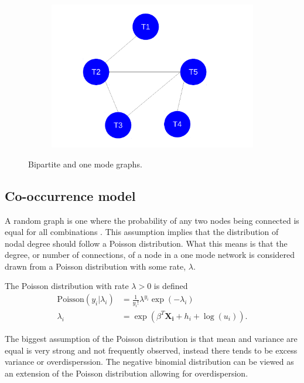 \documentclass[12pt,letterpaper]{article}
\begin{document}
\begin{figure}[ht]
  \begin{subfigure}[b]{0.4\textwidth}
    \caption{}
    \includegraphics[height = 0.5\textheight, width = \textwidth, keepaspectratio = true]{figure/one_mode}
    \label{subfig:one_mode}
  \end{subfigure}
  \caption{Bipartite and one mode graphs.}
  \label{fig:graphs}
\end{figure}


\subsection{Co-occurrence model}
A random graph is one where the probability of any two nodes being connected is equal for all combinations \citep{Erdos1959}. This assumption implies that the distribution of nodal degree should follow a Poisson distribution. What this means is that the degree, or number of connections, of a node in a one mode network is considered drawn from a Poisson distribution with some rate, \(\lambda\).

The Poisson distribution with rate \(\lambda > 0\) is defined 
\begin{align}
  \mathrm{Poisson}(y_{i} | \lambda_{i}) &= \frac{1}{y_{i}!} \lambda^{y_{i}} \exp(-\lambda_{i}) 
  \label{eq:pois} \\
  \lambda_{i} &= \exp(\beta^{T}\mathbf{X_{i}} + h_{i} + \log(u_{i})).
  \label{eq:lambda}
\end{align}

The biggest assumption of the Poisson distribution is that mean and variance are equal is very strong and not frequently observed, instead there tends to be excess variance or overdisperssion. The negative binomial distribution can be viewed as an extension of the Poisson distribution allowing for overdispersion. 
\end{document}
